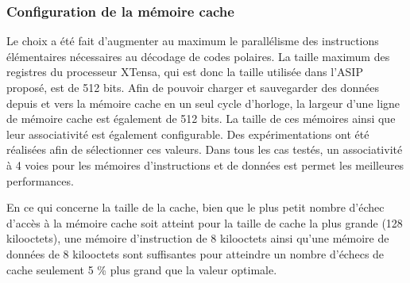 \subsubsection{Configuration de la mémoire cache}
Le choix a été fait d'augmenter au maximum le parallélisme des instructions élémentaires nécessaires au décodage de codes polaires. La taille maximum des registres du processeur XTensa, qui est donc la taille utilisée dans l'ASIP proposé, est de 512 bits. Afin de pouvoir charger et sauvegarder des données depuis et vers la mémoire cache en un seul cycle d'horloge, la largeur d'une ligne de mémoire cache est également de 512 bits. La taille de ces mémoires ainsi que leur associativité est également configurable. Des expérimentations ont été réalisées afin de sélectionner ces valeurs. Dans tous les cas testés, un associativité à 4 voies pour les mémoires d'instructions et de données est permet les meilleures performances.

En ce qui concerne la taille de la cache, bien que le plus petit nombre d'échec d'accès à la mémoire cache soit atteint pour la taille de cache la plus grande (128 kilooctets), une mémoire d'instruction de 8 kilooctets ainsi qu'une mémoire de données de 8 kilooctets sont suffisantes pour atteindre un nombre d'échecs de cache seulement 5 \%
plus grand que la valeur optimale.

